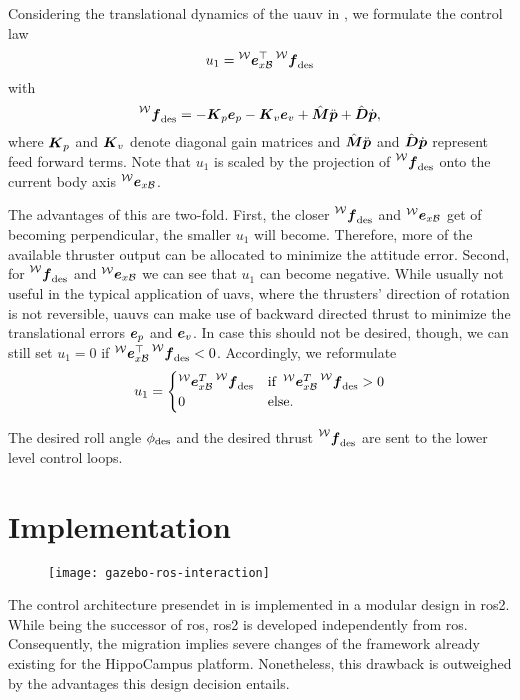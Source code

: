 Considering the translational dynamics of the \ac{uauv} in , we formulate the control law
\begin{equation}
	\label{eq:translational-control-law-short}
	u_1 = \exbodyinworld^\top \thrustdesiredworld
\end{equation}
with
\begin{equation}
	\thrustdesiredworld =
	-\Kb_p \eb_p
	- \Kb_v \eb_v
	+ \hat{\bm{M}} \pbpp
	+ \hat{\bm{D}} \pbp
	,
\end{equation}
where $\mbox{$\bm{K}$}_p$ and $\mbox{$\bm{K}$}_v$ denote diagonal gain matrices and $\hat{\bm{M}} \mbox{$\ddot{\bm{p}}$}$ and $\hat{\bm{D}}\mbox{$\dot{\bm{p}}$}$ represent feed forward terms. Note that $u_1$ is scaled by the projection of $\thrustdesiredworld$ onto the current body axis $\prescript{\mathcal{W}}{}{\mbox{$\bm{e}$}}_{x\mathcal{B}}$.

The advantages of this are two-fold. First, the closer $\thrustdesiredworld$ and $\prescript{\mathcal{W}}{}{\mbox{$\bm{e}$}}_{x\mathcal{B}}$ get of becoming perpendicular, the smaller $u_1$ will become. Therefore, more of the available thruster output can be allocated to minimize the attitude error. Second, for $\thrustdesiredworld$ and $\prescript{\mathcal{W}}{}{\mbox{$\bm{e}$}}_{x\mathcal{B}}$ we can see that $u_1$ can become negative. While usually not useful in the typical application of \acp{uav}, where the thrusters' direction of rotation is not reversible, \acp{uauv} can make use of backward directed thrust to minimize the translational errors $\mbox{$\bm{e}$}_p$ and $\mbox{$\bm{e}$}_v$. In case this should not be desired, though, we can still set $u_1=0$ if $\exbodyinworld^\top \thrustdesiredworld < 0$. Accordingly, we reformulate 
\begin{equation}
	u_1 = 
	\begin{cases}
		\exbodyinworld^T \thrustdesiredworld & \text{if } \exbodyinworld^T \thrustdesiredworld > 0 \\
		0 & \text{else.}
	\end{cases}
\end{equation}

The desired roll angle $\phi_{\text{des}}$ and the desired thrust $\thrustdesiredworld$ are sent to the lower level control loops.




\section{Implementation}
\begin{figure}
	\centering
	\texttt{[image: gazebo-ros-interaction]}
\end{figure}
The control architecture presendet in  is implemented in a modular design in \ac{ros2}. While being the successor of \ac{ros}, \ac{ros2} is developed independently from \ac{ros}.
Consequently, the migration implies severe changes of the framework already existing for the HippoCampus platform. Nonetheless, this drawback is outweighed by the advantages this design decision entails. 

